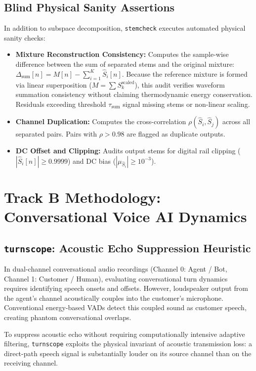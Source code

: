 \documentclass[10pt,journal,compsoc]{IEEEtran}
\begin{document}
\subsection{Blind Physical Sanity Assertions}
In addition to subspace decomposition, \texttt{stemcheck} executes automated physical sanity checks:
\begin{itemize}
    \item \textbf{Mixture Reconstruction Consistency:} Computes the sample-wise difference between the sum of separated stems and the original mixture: $\Delta_{\text{sum}}[n] = M[n] - \sum_{i=1}^K \hat{S}_i[n]$. Because the reference mixture is formed via linear superposition ($M = \sum S_k^{\text{scaled}}$), this audit verifies waveform summation consistency without claiming thermodynamic energy conservation. Residuals exceeding threshold $\tau_{\text{sum}}$ signal missing stems or non-linear scaling.
    \item \textbf{Channel Duplication:} Computes the cross-correlation $\rho(\hat{S}_i, \hat{S}_j)$ across all separated pairs. Pairs with $\rho > 0.98$ are flagged as duplicate outputs.
    \item \textbf{DC Offset and Clipping:} Audits output stems for digital rail clipping ($|\hat{S}_i[n]| \ge 0.9999$) and DC bias ($|\mu_{\hat{S}_i}| \ge 10^{-3}$).
\end{itemize}

\section{Track B Methodology: Conversational Voice AI Dynamics}

\subsection{\texttt{turnscope}: Acoustic Echo Suppression Heuristic}
In dual-channel conversational audio recordings (Channel 0: Agent / Bot, Channel 1: Customer / Human), evaluating conversational turn dynamics requires identifying speech onsets and offsets. However, loudspeaker output from the agent's channel acoustically couples into the customer's microphone. Conventional energy-based VADs detect this coupled sound as customer speech, creating phantom conversational overlaps.

To suppress acoustic echo without requiring computationally intensive adaptive filtering, \texttt{turnscope} exploits the physical invariant of acoustic transmission loss: a direct-path speech signal is substantially louder on its source channel than on the receiving channel.
\end{document}
